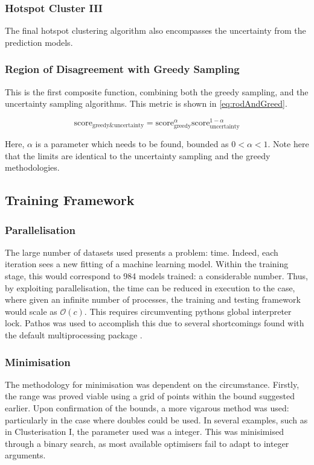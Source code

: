     \subsubsection{Hotspot Cluster III}
    The final hotspot clustering algorithm also encompasses the uncertainty from the prediction models.

    \subsubsection{Region of Disagreement with Greedy Sampling}
    This is the first composite function, combining both the greedy sampling, and the uncertainty sampling algorithms. This metric is shown in \ref{eq:rodAndGreed}.

    \begin{equation}
        \label{eq:rodAndGreed}
        {\mathrm{score}_\mathrm{greedy\&uncertainty}=\mathrm{score}_\mathrm{greedy}^{\alpha}\mathrm{score}_\mathrm{uncertainty}^{1-\alpha}}
    \end{equation}

    Here, $\alpha$ is a parameter which needs to be found, bounded as $0<\alpha{}<1$. Note here that the limits are identical to the uncertainty sampling and the greedy methodologies.

    \subsection{Training Framework}
    \blindtext[1]
    \subsubsection{Parallelisation}
    The large number of datasets used presents a problem: time. Indeed, each iteration sees a new fitting of a machine learning model. Within the training stage, this would correspond to 984 models trained: a considerable number. Thus, by exploiting parallelisation, the time can be reduced in execution to the case, where given an infinite number of processes, the training and testing framework would scale as $\mathcal{O}(c)$. This requires circumventing pythons global interpreter lock. Pathos was used to accomplish this due to several shortcomings found with the default multiprocessing package \cite{pathos1,pathos2}.

\subsubsection{Minimisation}
The methodology for minimisation was dependent on the circumstance. Firstly, the range was proved viable using a grid of points within the bound suggested earlier. Upon confirmation of the bounds, a more vigarous method was used: particularly in the case where doubles could be used. In several examples, such as in Clusterisation I, the parameter used was a integer. This was minisimised through a binary search, as most available optimisers fail to adapt to integer arguments.
\blindtext[1]